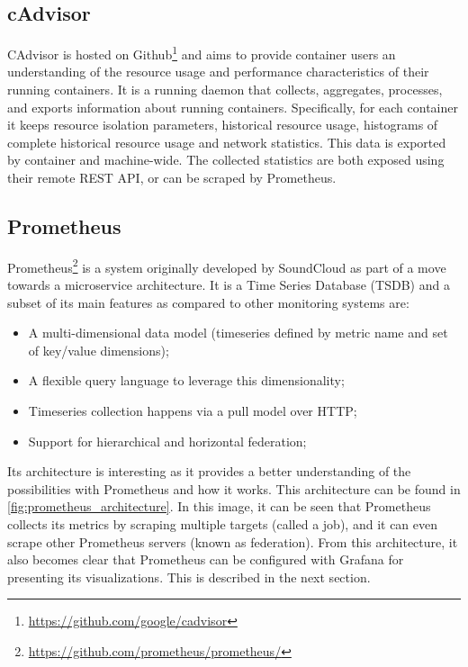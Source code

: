 \subsection{cAdvisor}
CAdvisor is hosted on Github\footnote{\url{https://github.com/google/cadvisor}} and aims to provide container users an understanding of the resource usage and performance characteristics of their running containers. It is a running daemon that collects, aggregates, processes, and exports information about running containers. Specifically, for each container it keeps resource isolation parameters, historical resource usage, histograms of complete historical resource usage and network statistics. This data is exported by container and machine-wide. The collected statistics are both exposed using their remote REST API, or can be scraped by Prometheus.

\subsection{Prometheus} 
Prometheus\footnote{\url{https://github.com/prometheus/prometheus/}} is a system originally developed by SoundCloud as part of a move towards a microservice architecture. It is a Time Series Database (TSDB) and a subset of its main features as compared to other monitoring systems are: 

\begin{itemize}
    \item A multi-dimensional data model (timeseries defined by metric name and set of key/value dimensions);
    \item A flexible query language to leverage this dimensionality;
    \item Timeseries collection happens via a pull model over HTTP;
    \item Support for hierarchical and horizontal federation;
\end{itemize}
    
Its architecture is interesting as it provides a better understanding of the possibilities with Prometheus and how it works. This architecture can be found in \autoref{fig:prometheus_architecture}. In this image, it can be seen that Prometheus collects its metrics by scraping multiple targets (called a job), and it can even scrape other Prometheus servers (known as federation). From this architecture, it also becomes clear that Prometheus can be configured with Grafana for presenting its visualizations. This is described in the next section.\\

